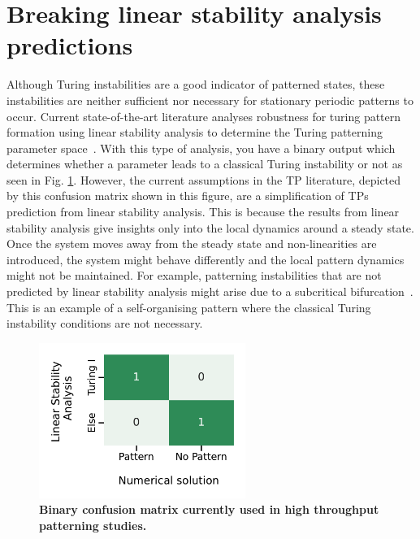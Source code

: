 \section{Breaking linear stability analysis predictions}
Although Turing instabilities are a good indicator of patterned states, these instabilities are neither sufficient nor necessary for stationary periodic patterns to occur.
Current state-of-the-art literature analyses robustness for turing pattern formation using linear stability analysis to determine the Turing patterning parameter space~\parencite{Scholes2019, Zheng2016, Marcon}.
With this type of analysis, you have a binary output which determines whether a parameter leads to a classical Turing instability or not as seen in Fig. \ref{fig:lsa_numerical_confusion_literature}.
However, the current assumptions in the TP literature, depicted by this confusion matrix shown in this figure, are a simplification of TPs prediction from linear stability analysis.
This is because the results from linear stability analysis give insights only into the local dynamics around a steady state.
Once the system moves away from the steady state and non-linearities are introduced, the system might behave differently and the local pattern dynamics might not be maintained.
For example, patterning instabilities that are not predicted by linear stability analysis might arise due to a subcritical bifurcation~\parencite{villar, champneys}.%
This is an example of a self-organising pattern where the classical Turing instability conditions are not necessary.


\begin{figure}[H] %
    \centering
    \includegraphics[width=0.6\textwidth]{chapters/Chapter 1/lsa_vs_numerical_confusion_literature} %
    \caption{\textbf{Binary confusion matrix currently used in high throughput patterning studies.} }
    \label{fig:lsa_numerical_confusion_literature} %
\end{figure}


